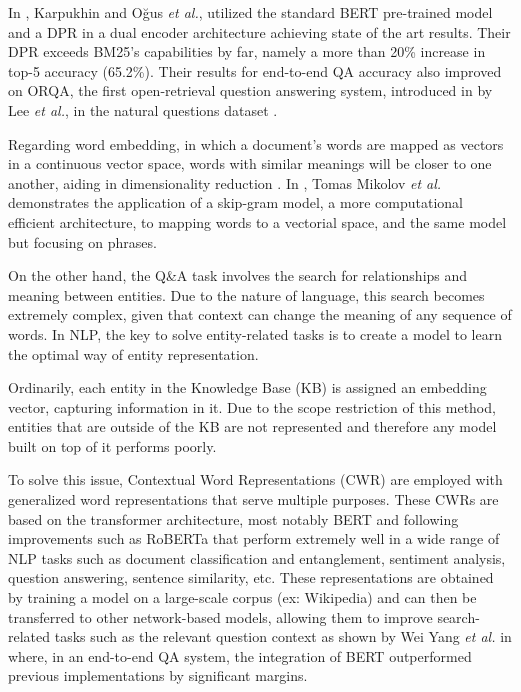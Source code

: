 \documentclass[runningheads]{llncs}
\begin{document}
In \cite{karpukhin2020dense}, Karpukhin and Oğus \textit{et al.}, utilized the standard BERT pre-trained model and a DPR in a dual encoder architecture achieving state of the art results. Their DPR exceeds BM25's capabilities by far, namely a more than 20\% increase in top-5 accuracy (65.2\%). Their results for end-to-end QA accuracy also improved on ORQA, the first open-retrieval question answering system, introduced in \cite{lee2019latent} by Lee \textit{et al.}, in the natural questions dataset \cite{kwiatkowski2019natural}.

Regarding word embedding, in which a document's words are mapped as vectors in a continuous vector space, words with similar meanings will be closer to one another, aiding in dimensionality reduction \cite{8258123}. In \cite{mikolov2013distributed}, Tomas Mikolov \textit{et al.} demonstrates the application of a skip-gram model, a more computational efficient architecture, to mapping words to a vectorial space, and the same model but focusing on phrases. 

On the other hand, the Q\&A task involves the search for relationships and meaning between entities. Due to the nature of language, this search becomes extremely complex, given that context can change the meaning of any sequence of words. In NLP, the key to solve entity-related tasks is to create a model to learn the optimal way of entity representation. 

Ordinarily, each entity in the Knowledge Base (KB) is assigned an embedding vector, capturing information in it. Due to the scope restriction of this method, entities that are outside of the KB are not represented and therefore any model built on top of it performs poorly.

To solve this issue, Contextual Word Representations (CWR) are employed with generalized word representations that serve multiple purposes. These CWRs are based on the transformer architecture, most notably BERT \cite{devlin2019bert} and following improvements such as RoBERTa \cite{liu2019roberta} that perform extremely well in a wide range of NLP tasks such as document classification and entanglement, sentiment analysis, question answering, sentence similarity, etc. These representations are obtained by training a model on a large-scale corpus (ex: Wikipedia) and can then be transferred to other network-based models, allowing them to improve search-related tasks such as the relevant question context as shown by Wei Yang \textit{et al.} in \cite{yang2019end} where, in an end-to-end QA system, the integration of BERT outperformed previous implementations by significant margins. %
\end{document}
